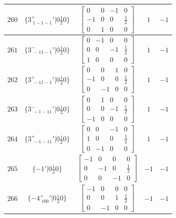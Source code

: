 \documentclass[fleqn,8pt]{jsarticle}
\begin{document}
\begin{longtable}{ccccc}
$ 260 $ & $ \{3^{+}_{\,\,1-1-1}{}'|0 \frac{1}{2} 0\} $ & $ \begin{bmatrix} 0 & 0 & -1 & 0 \\ -1 & 0 & 0 & \frac{1}{2} \\ 0 & 1 & 0 & 0 \end{bmatrix} $ & $ 1 $ & $ -1 $ \\ \hline
$ 261 $ & $ \{3^{-}_{\,\,-11-1}{}'|0 \frac{1}{2} 0\} $ & $ \begin{bmatrix} 0 & -1 & 0 & 0 \\ 0 & 0 & -1 & \frac{1}{2} \\ 1 & 0 & 0 & 0 \end{bmatrix} $ & $ 1 $ & $ -1 $ \\ \hline
$ 262 $ & $ \{3^{+}_{\,\,-11-1}{}'|0 \frac{1}{2} 0\} $ & $ \begin{bmatrix} 0 & 0 & 1 & 0 \\ -1 & 0 & 0 & \frac{1}{2} \\ 0 & -1 & 0 & 0 \end{bmatrix} $ & $ 1 $ & $ -1 $ \\ \hline
$ 263 $ & $ \{3^{-}_{\,\,-1-11}{}'|0 \frac{1}{2} 0\} $ & $ \begin{bmatrix} 0 & 1 & 0 & 0 \\ 0 & 0 & -1 & \frac{1}{2} \\ -1 & 0 & 0 & 0 \end{bmatrix} $ & $ 1 $ & $ -1 $ \\ \hline
$ 264 $ & $ \{3^{+}_{\,\,-1-11}{}'|0 \frac{1}{2} 0\} $ & $ \begin{bmatrix} 0 & 0 & -1 & 0 \\ 1 & 0 & 0 & \frac{1}{2} \\ 0 & -1 & 0 & 0 \end{bmatrix} $ & $ 1 $ & $ -1 $ \\ \hline
$ 265 $ & $ \{-1{}'|0 \frac{1}{2} 0\} $ & $ \begin{bmatrix} -1 & 0 & 0 & 0 \\ 0 & -1 & 0 & \frac{1}{2} \\ 0 & 0 & -1 & 0 \end{bmatrix} $ & $ -1 $ & $ -1 $ \\ \hline
$ 266 $ & $ \{-4^{+}_{\,\,100}{}'|0 \frac{1}{2} 0\} $ & $ \begin{bmatrix} -1 & 0 & 0 & 0 \\ 0 & 0 & 1 & \frac{1}{2} \\ 0 & -1 & 0 & 0 \end{bmatrix} $ & $ -1 $ & $ -1 $ \\ \hline

\end{longtable}
\end{document}
